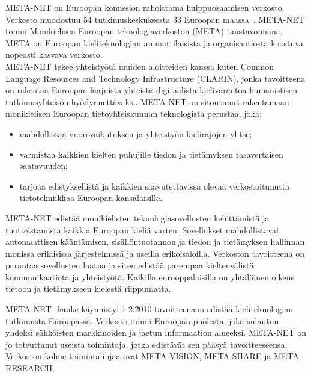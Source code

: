 \cleardoublepage
\begin{multicols}{2}

META-NET on Euroopan komission rahoittama huippuosaamisen
verkosto. Verkosto muodostuu 54 tutkimuskeskuksesta 33 Euroopan
maassa~\cite{rehm2011}. META-NET toimii Monikielisen Euroopan teknologiaverkoston
(META) taustavoimana. META on Euroopan kieliteknologian
ammattilaisista ja organisaatiosta koostuva nopeasti kasvava verkosto.\\
META-NET tekee yhteistyötä muiden aloitteiden kanssa kuten Common
Language Resources and Technology Infrastructure (CLARIN), jonka
tavoitteena on rakentaa Euroopan laajuista yhteistä digitaalista
kielivarantoa humanistisen tutkimusyhteisön hyödynnettäväksi. META-NET
on sitoutunut rakentamaan monikielisen Euroopan tietoyhteiskunnan
teknologista perustaa, joka:

\begin{itemize}
\item mahdollistaa vuorovaikutuksen ja yhteistyön kielirajojen ylitse;

\item varmistaa kaikkien kielten puhujille tiedon ja tietämyksen
  tasavertaisen saatavuuden;

\item tarjoaa edistyksellistä ja kaikkien saavutettavissa olevaa
  verkostoitunutta tietotekniikkaa Euroopan kansalaisille.
\end{itemize}

META-NET edistää monikielisten teknologiasovellusten kehittämistä ja
tuotteistamista kaikkia Euroopan kieliä varten. Sovellukset
mahdollistavat automaattisen kääntämisen, sisällöntuotannon ja tiedon
ja tietämyksen hallinnan monissa erilaisissa järjestelmissä ja useilla
erikoisaloilla. Verkoston tavoitteena on parantaa sovellusten laatua
ja siten edistää parempaa kieltenvälistä kommunikaatiota ja
yhteistyötä. Kaikilla eurooppalaisilla on yhtäläinen oikeus tietoon ja
tietämykseen kielestä riippumatta.




META-NET -hanke käynnistyi 1.2.2010 tavoitteenaan edistää
kieliteknologian tutkimusta Euroopassa. Verkosto toimii Euroopan
puolesta, joka sulautuu yhdeksi sähköisten markkinoiden ja jaetun
informaation alueeksi. META-NET on jo toteuttanut useista toimintoja,
jotka edistävät sen pääsyä tavoitteeseensa.  Verkoston kolme
toimintalinjaa ovat META-VISION, META-SHARE ja META-RESEARCH.




\end{multicols}
